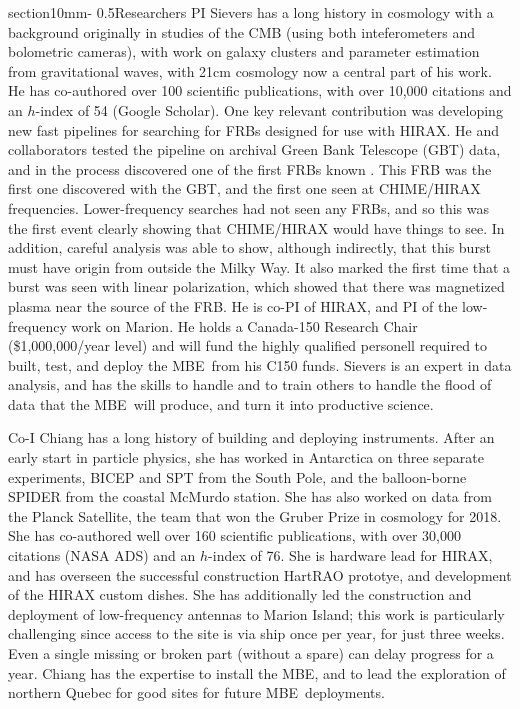 \documentclass[letterpaper,11pt,preprint]{aastex}
\makeatletter
\newcommand{\mbe}{{\rm MBE}}
\renewcommand{\section}{\@startsection%
{section}{1}{0mm}{-\baselineskip}%
{0.5\baselineskip}{\normalfont\Large\bfseries}}%
\makeatother
\begin{document}
\section{Researchers}
PI Sievers has a long history in cosmology with a background
originally in studies of the CMB (using both inteferometers and
bolometric cameras), with work on galaxy clusters and parameter
estimation from gravitational waves, with 21cm cosmology now a central
part of his work.  He has co-authored over 100 scientific
publications, with over 10,000 citations and an $h$-index of 54
(Google Scholar).  One key relevant contribution was developing new
fast pipelines for searching for FRBs designed for use with HIRAX.  He
and collaborators tested the pipeline on archival Green Bank Telescope
(GBT) data, and in the process discovered one of the first FRBs known
\citep{Masui15}.  This FRB was the first one discovered with the GBT,
and the first one seen at CHIME/HIRAX frequencies.  Lower-frequency
searches had not seen any FRBs, and so this was the first event
clearly showing that CHIME/HIRAX would have things to see.  In
addition, careful analysis was able to show, although indirectly, that
this burst must have origin from outside the Milky Way.  It also
marked the first time that a burst was seen with linear polarization,
which showed that there was magnetized plasma near the source of the
FRB.  He is co-PI of HIRAX, and PI of the low-frequency work on
Marion.  He holds a Canada-150 Research Chair (\$1,000,000/year level)
and will fund the highly qualified personell required to built, test,
and deploy the \mbe\ from his C150 funds.  Sievers is an expert in
data analysis, and has the skills to handle and to train others to
handle the flood of data that the \mbe\ will produce, and turn it into
productive science.

Co-I Chiang has a long history of building and deploying instruments.
After an early start in particle physics, she has worked in Antarctica
on three separate experiments, BICEP and SPT from the South Pole, and
the balloon-borne SPIDER from the coastal McMurdo station.  She has
also worked on data from the Planck Satellite, the team that won the
Gruber Prize in cosmology for 2018.  She has co-authored well over 160
scientific publications, with over 30,000 citations (NASA ADS) and an
$h$-index of 76.  She is hardware lead for HIRAX, and has overseen the
successful construction HartRAO prototye, and development of the HIRAX
custom dishes.  She has additionally led the construction and
deployment of low-frequency antennas to Marion Island; this work is
particularly challenging since access to the site is via ship once per
year, for just three weeks.  Even a single missing or broken part
(without a spare) can delay progress for a year.  Chiang has the
expertise to install the \mbe, and to lead the exploration of northern
Quebec for good sites for future \mbe\ deployments.
\end{document}
